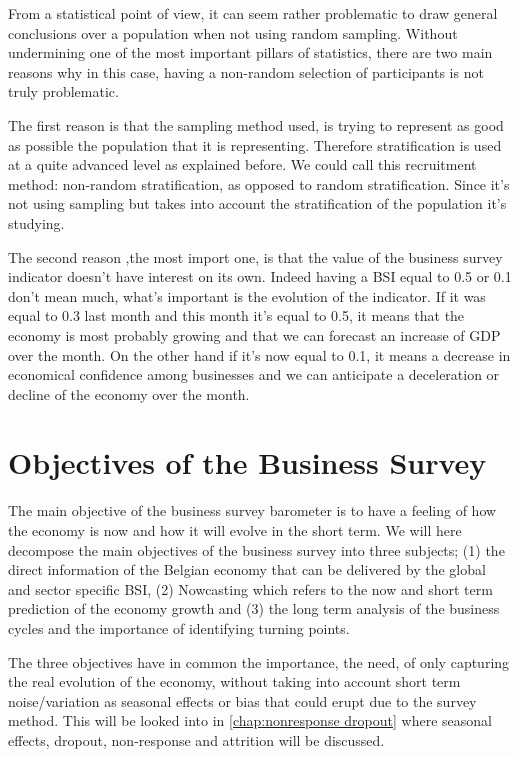 \documentclass[12pt,a4paper,oneside]{book}
\begin{document}

From a statistical point of view, it can seem rather problematic to draw general conclusions over a population when not  using random sampling.
Without undermining one of the most important pillars of statistics, there are two main reasons why in this case, having a non-random selection of participants is not truly problematic.

The first reason is that the sampling method used, is trying to represent as good as possible the population that it is representing. Therefore stratification is used at a quite advanced level as explained before. 
We could call this recruitment method: non-random stratification, as opposed to random stratification. Since it's not using sampling but takes into account the stratification of the population it's studying.

The second reason ,the most import one, is that the value of the business survey indicator doesn't have interest on its own. Indeed having a BSI equal to 0.5 or 0.1 don't mean much, what's important is the evolution of the indicator. If it was equal to 0.3 last month and this month it's equal to 0.5, it means that the economy is most probably growing and that we can forecast an increase of GDP over the month. On the other hand if it's now equal to 0.1, it means a decrease in economical confidence among businesses and we can anticipate a deceleration or decline of the economy over the month.


\section{Objectives of the Business Survey}
\label{section:Objective}


The main objective of the business survey barometer is to have a feeling of how the economy is now and how it will evolve in the short term.
We will here decompose the main objectives of the business survey into three subjects; (1) the direct information of the Belgian economy that can be delivered by the global and sector specific BSI, (2) Nowcasting which refers to the now and short term prediction of the economy growth and (3) the long term analysis of the business cycles and the importance of identifying turning points.

The three objectives have in common the importance, the need,  of only capturing the real evolution of the economy, without taking into account short term noise/variation as seasonal effects or bias that could erupt due to the survey method.
This will be looked into in \autoref{chap:nonresponse dropout} where seasonal effects, dropout, non-response and attrition will be discussed.
\end{document}
